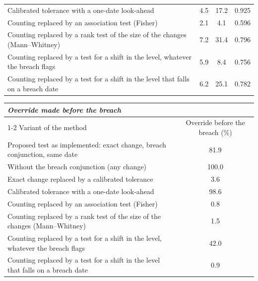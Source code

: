 \begin{table}[htbp]
\begin{tabular}{p{6.4cm}ccc}
Calibrated tolerance with a one-date look-ahead & 4.5 & 17.2 & 0.925 \\
Counting replaced by an association test (Fisher) & 2.1 & 4.1 & 0.596 \\
Counting replaced by a rank test of the size of the changes (Mann--Whitney) & 7.2 & 31.4 & 0.796 \\
Counting replaced by a test for a shift in the level, whatever the breach flags & 5.9 & 8.4 & 0.756 \\
Counting replaced by a test for a shift in the level that falls on a breach date & 6.2 & 25.1 & 0.782 \\
\bottomrule
\end{tabular}
\par\medskip
\begin{tabular}{p{6.4cm}c}
\toprule
\multicolumn{2}{l}{\textit{Override made before the breach}} \\
\cmidrule(lr){1-2}
Variant of the method & Override before the breach (\%) \\
\midrule
Proposed test as implemented: exact change, breach conjunction, same date & 81.9 \\
Without the breach conjunction (any change) & 100.0 \\
Exact change replaced by a calibrated tolerance & 3.6 \\
Calibrated tolerance with a one-date look-ahead & 98.6 \\
Counting replaced by an association test (Fisher) & 0.8 \\
Counting replaced by a rank test of the size of the changes (Mann--Whitney) & 1.5 \\
Counting replaced by a test for a shift in the level, whatever the breach flags & 42.0 \\
Counting replaced by a test for a shift in the level that falls on a breach date & 0.9 \\
\bottomrule
\end{tabular}
\end{table}
